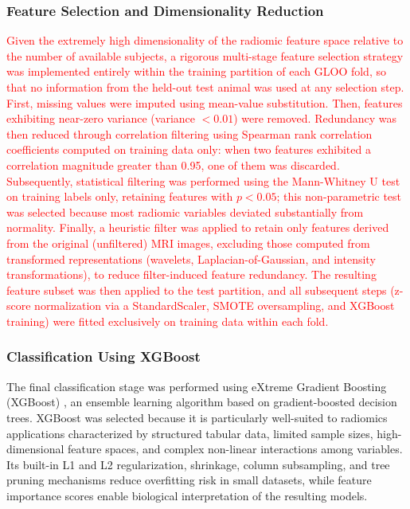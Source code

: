 \documentclass{article}
\begin{document}
\subsubsection{Feature Selection and Dimensionality Reduction}

\textcolor{red}{Given the extremely high dimensionality of the radiomic feature space relative to the number of available subjects, a rigorous multi-stage feature selection strategy was implemented entirely within the training partition of each GLOO fold, so that no information from the held-out test animal was used at any selection step. First, missing values were imputed using mean-value substitution. Then, features exhibiting near-zero variance (variance $<0.01$) were removed. Redundancy was then reduced through correlation filtering using Spearman rank correlation coefficients computed on training data only: when two features exhibited a correlation magnitude greater than 0.95, one of them was discarded. Subsequently, statistical filtering was performed using the Mann-Whitney U test on training labels only, retaining features with $p < 0.05$; this non-parametric test was selected because most radiomic variables deviated substantially from normality. Finally, a heuristic filter was applied to retain only features derived from the original (unfiltered) MRI images, excluding those computed from transformed representations (wavelets, Laplacian-of-Gaussian, and intensity transformations), to reduce filter-induced feature redundancy. The resulting feature subset was then applied to the test partition, and all subsequent steps (z-score normalization via a StandardScaler, SMOTE oversampling, and XGBoost training) were fitted exclusively on training data within each fold.}

\subsubsection{Classification Using XGBoost}

The final classification stage was performed using eXtreme Gradient Boosting (XGBoost) \cite{Chen2016}, an ensemble learning algorithm based on gradient-boosted decision trees. XGBoost was selected because it is particularly well-suited to radiomics applications characterized by structured tabular data, limited sample sizes, high-dimensional feature spaces, and complex non-linear interactions among variables. Its built-in L1 and L2 regularization, shrinkage, column subsampling, and tree pruning mechanisms reduce overfitting risk in small datasets, while feature importance scores enable biological interpretation of the resulting models.
\end{document}
